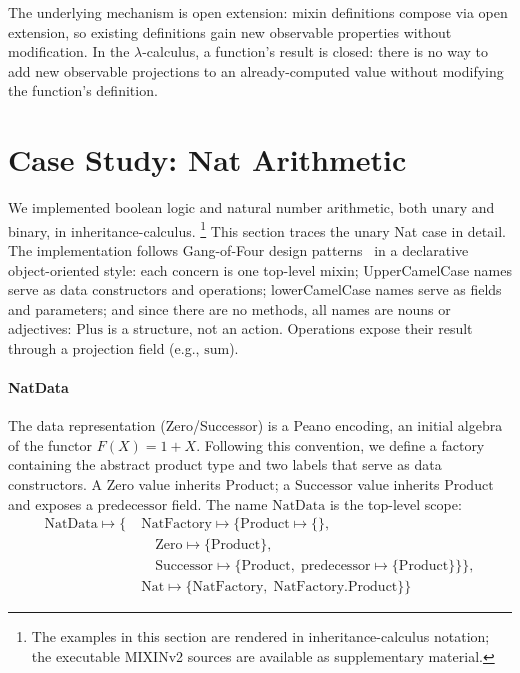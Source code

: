 The underlying mechanism is open extension: mixin
definitions compose via open extension, so existing
definitions gain new observable properties without
modification.  In the $\lambda$-calculus, a function's result
is closed: there is no way to add new observable projections
to an already-computed value without modifying the function's
definition.

\section{Case Study: Nat Arithmetic}
\label{sec:case-study}
\label{sec:expression-problem}

We implemented boolean logic and natural number arithmetic, both unary
and binary, in inheritance-calculus.%
\footnote{
  The examples in this section are rendered in
  inheritance-calculus notation; the executable MIXINv2
  sources
  are available as supplementary material.
}
This section traces the unary Nat case in detail.
The implementation follows Gang-of-Four design
patterns~\cite{gamma1994-design-patterns} in a declarative
object-oriented style:
each concern is one top-level mixin;
UpperCamelCase names serve as data constructors and operations;
lowerCamelCase names serve as fields and parameters;
and since there are no methods, all names are nouns or adjectives: $\mathrm{Plus}$
is a structure, not an action.
Operations expose their result through a projection field (e.g., $\mathrm{sum}$).

\paragraph{NatData}
The data representation (Zero/Successor) is a Peano
encoding, an initial algebra of the functor $F(X) = 1 + X$.
Following this convention, we define a factory containing the abstract product type and two
labels that serve as data constructors.
A $\mathrm{Zero}$ value inherits $\mathrm{Product}$;
a $\mathrm{Successor}$ value inherits $\mathrm{Product}$ and
exposes a $\mathrm{predecessor}$ field.
The name $\mathrm{NatData}$ is the top-level scope:
\begin{align*}
  \mathrm{NatData} \mapsto \{\;&
    \mathrm{NatFactory} \mapsto \{
      \mathrm{Product} \mapsto \{\},\\
      &\quad
      \mathrm{Zero} \mapsto \{\mathrm{Product}\},\\
      &\quad
      \mathrm{Successor} \mapsto \{
        \mathrm{Product},\;
    \mathrm{predecessor} \mapsto \{\mathrm{Product}\}\}\},\\
    &\mathrm{Nat} \mapsto \{\mathrm{NatFactory},\;
  \mathrm{NatFactory}.\mathrm{Product}\}\}
\end{align*}

